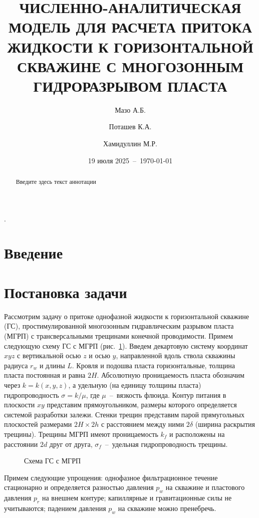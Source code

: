 \documentclass{article}
\title{ЧИСЛЕННО-АНАЛИТИЧЕСКАЯ МОДЕЛЬ ДЛЯ РАСЧЕТА ПРИТОКА ЖИДКОСТИ
К ГОРИЗОНТАЛЬНОЙ СКВАЖИНЕ С МНОГОЗОННЫМ ГИДРОРАЗРЫВОМ ПЛАСТА}
\author[1]{Мазо А.Б.}
\author[1]{Поташев К.А.}
\author[2]{Хамидуллин М.Р.}
\affil[1]{Казанский федеральный университет, Казань, Россия}
\affil[2]{Научно-исследовательский центр ``Курчатовский институт''}
\date{19 июля 2025~--~\today}
\begin{document}
\maketitle

\tableofcontents

\listoffigures

\listoftables.

\begin{abstract}
  Введите здесь текст аннотации
\end{abstract}

\section*{Введение}

\section{Постановка задачи}
Рассмотрим задачу о притоке однофазной жидкости к горизонтальной скважине (ГС),
простимулированной многозонным гидравлическим разрывом пласта (МГРП)
с трансверсальными трещинами конечной проводимости. Примем следующую схему
ГС с МГРП (рис.~\ref{fig:kham_main_scheme}).
Введем декартовую систему координат $xyz$ с вертикальной осью $z$ и осью $y$,
направленной вдоль ствола скважины радиуса $r_w$ и длины $L$.
Кровля и подошва пласта горизонтальные, толщина пласта постоянная и равна $2H$.
Абсолютную проницаемость пласта обозначим через $k=k\left(x,y,z\right)$,
а удельную (на единицу толщины пласта)
гидропроводность $\sigma = k / \mu$, где $\mu$~--~вязкость флюида.
Контур питания в плоскости $xy$ представим прямоугольником, размеры которого
определяется системой разработки залежи. Стенки трещин представим парой
прямугольных плоскостей размерами $2H \times 2h$ с расстоянием между
ними $2\delta$ (ширина раскрытия трещины). Трещины МГРП имеют проницаемость
$k_f$ и расположены на расстоянии $2d$ друг от друга, $\sigma_f$~--~удельная
гидропроводность трещины.

\begin{figure}[!ht]
  \centering
  
  \caption{\label{fig:kham_main_scheme}Схема ГС с МГРП}
\end{figure}

Примем следующие упрощения: однофазное фильтрационное течение стационарно
и определяется разностью давления $p_w$ на скважине и пластового давления
$p_r$ на внешнем контуре; капиллярные и гравитационные силы не учитываются;
падением давления $p_w$ на скважине можно пренебречь.
\end{document}
